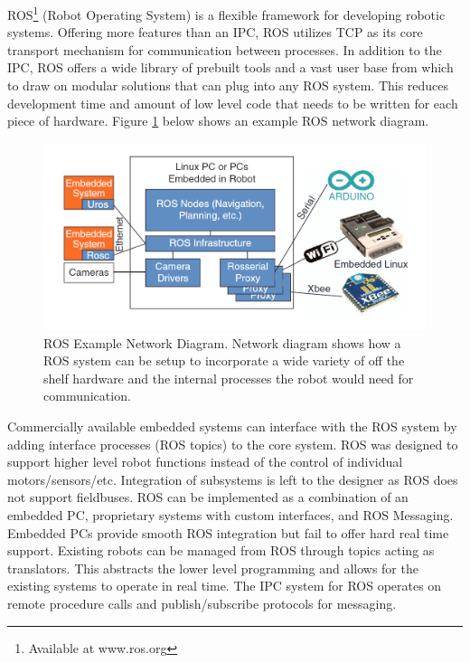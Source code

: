 ROS\footnote{Available at www.ros.org} (Robot Operating System) is a flexible framework for developing robotic systems. Offering more features than an IPC, ROS utilizes TCP as its core transport mechanism for communication between processes\cite{ROSGOOD, EDUROS}. In addition to the IPC, ROS offers a wide library of prebuilt tools and a vast user base from which to draw on modular solutions that can plug into any ROS system\cite{ROSGOOD, IPCS}. This reduces development time and amount of low level code that needs to be written for each piece of hardware\cite{EMBEDDEDROS}. Figure \ref{fig:ROS Network Diagram} below shows an example ROS network diagram.

\begin{figure}[thpb]
 \centering
 \includegraphics[width=1.0\columnwidth]{./images/rosnet.png}
  \caption{ROS Example Network Diagram\cite{EMBEDDEDROS}. Network diagram shows how a ROS system can be setup to incorporate a wide variety of off the shelf hardware and the internal processes the robot would need for communication.}
  \label{fig:ROS Network Diagram}
\end{figure} 

Commercially available embedded systems can interface with the ROS system by adding interface processes (ROS topics)\cite{EMBEDDEDROS} to the core system. ROS was designed to support higher level robot functions instead of the control of individual motors/sensors/etc. Integration of subsystems is left to the designer as ROS does not support fieldbuses\cite{EMBEDDEDROS}. ROS can be implemented as a combination of an embedded PC, proprietary systems with custom interfaces, and ROS Messaging. Embedded PCs provide smooth ROS integration but fail to offer hard real time support\cite{ROSGOOD}. Existing robots can be managed from ROS through topics acting as translators. This abstracts the lower level programming and allows for the existing systems to operate in real time\cite{ROSGOOD, EMBEDDEDROS}. The IPC system for ROS operates on remote procedure calls and publish/subscribe protocols for messaging. 

